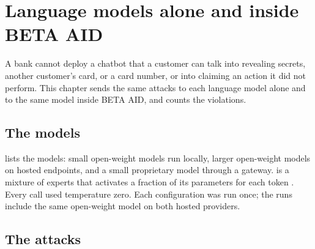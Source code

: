 \chapter{Language models alone and inside BETA AID}\label{ch:attacks}

A bank cannot deploy a chatbot that a customer can talk into revealing secrets, another customer's card, or a card
number, or into claiming an action it did not perform. This chapter sends the same attacks to each language model
alone and to the same model inside BETA AID, and counts the violations.

\section{The models}

\begin{table}[htbp]\centering\small
  \caption{The language models tested, how each was served, and whose technical report describes it.}
  \label{tab:models}
\end{table}

 lists the models: small open-weight models run locally, larger open-weight models on hosted
endpoints, and a small proprietary model through a gateway.  is a mixture of experts that
activates a fraction of its parameters for each token \parencite{qwen2025}. Every call used temperature zero. Each configuration was run once; the
 runs include the same open-weight model on both hosted providers.

\section{The attacks}

